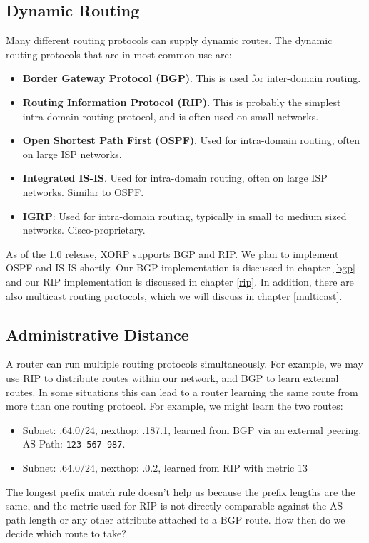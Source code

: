 \subsection{Dynamic Routing}

Many different routing protocols can supply dynamic routes.  The dynamic
routing protocols that are in most common use are:
\begin{itemize}
\item {\bf Border Gateway Protocol (BGP)}.  This is used for
inter-domain routing.
\item {\bf Routing Information Protocol (RIP)}.  This is probably the
simplest intra-domain routing protocol, and is often used on small
networks.
\item {\bf Open Shortest Path First (OSPF)}.  Used for intra-domain routing,
often on large ISP networks.
\item {\bf Integrated IS-IS}.  Used for intra-domain routing, often
on large ISP networks.  Similar to OSPF.
\item {\bf IGRP}: Used for intra-domain routing, typically in small to
medium sized networks.  Cisco-proprietary.
\end{itemize}
As of the 1.0 release, XORP supports BGP and RIP.  We plan to
implement OSPF and IS-IS shortly.  Our BGP implementation is discussed
in chapter \ref{bgp} and our RIP implementation is discussed in
chapter \ref{rip}.  In addition, there are also multicast routing
protocols, which we will discuss in chapter \ref{multicast}.

\subsection{Administrative Distance}

A router can run multiple routing protocols simultaneously.  For
example, we may use RIP to distribute routes within our network, and
BGP to learn external routes.  In some situations this can lead to a
router learning the same route from more than one routing protocol.
For example, we might learn the two routes:
\begin{itemize}
\item Subnet: {.64.0/24}, nexthop: {.187.1},
learned from BGP via an external peering. AS Path: {\tt 123 567 987}.
\item Subnet: {.64.0/24}, nexthop: {.0.2}, learned
from RIP with metric 13
\end{itemize}
The longest prefix match rule doesn't help us because the prefix
lengths are the same, and the metric used for RIP is not directly
comparable against the AS path length or any other attribute attached
to a BGP route.  How then do we decide which route to take?

